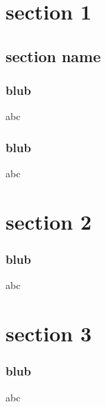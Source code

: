 \documentclass{beamer}
\begin{document}
	
	\section{section 1}
	\subsection{section name}
	\begin{frame}
		\frametitle{blub}
		abc
	\end{frame} 
	\begin{frame}
		\frametitle{blub}
		abc
	\end{frame} 
	
	\section{section 2}
	\begin{frame}
		\frametitle{blub}
		abc
	\end{frame} 
	
	\section{section 3}
	\begin{frame}
		\frametitle{blub}
		abc
	\end{frame}     
	
\end{document}
